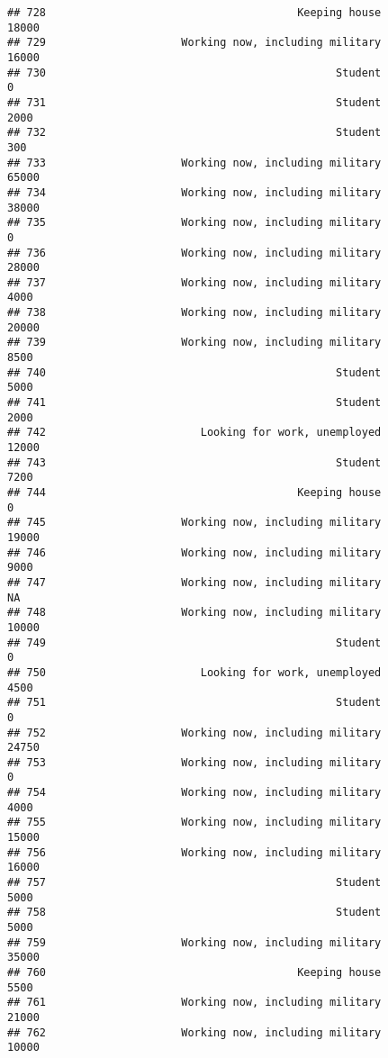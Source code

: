 \documentclass[]{book}
\theoremstyle{definition}
\theoremstyle{definition}
\theoremstyle{remark}
\begin{document}
\begin{verbatim}
## 728                                       Keeping house           18000
## 729                     Working now, including military           16000
## 730                                             Student               0
## 731                                             Student            2000
## 732                                             Student             300
## 733                     Working now, including military           65000
## 734                     Working now, including military           38000
## 735                     Working now, including military               0
## 736                     Working now, including military           28000
## 737                     Working now, including military            4000
## 738                     Working now, including military           20000
## 739                     Working now, including military            8500
## 740                                             Student            5000
## 741                                             Student            2000
## 742                        Looking for work, unemployed           12000
## 743                                             Student            7200
## 744                                       Keeping house               0
## 745                     Working now, including military           19000
## 746                     Working now, including military            9000
## 747                     Working now, including military              NA
## 748                     Working now, including military           10000
## 749                                             Student               0
## 750                        Looking for work, unemployed            4500
## 751                                             Student               0
## 752                     Working now, including military           24750
## 753                     Working now, including military               0
## 754                     Working now, including military            4000
## 755                     Working now, including military           15000
## 756                     Working now, including military           16000
## 757                                             Student            5000
## 758                                             Student            5000
## 759                     Working now, including military           35000
## 760                                       Keeping house            5500
## 761                     Working now, including military           21000
## 762                     Working now, including military           10000

\end{verbatim}
\end{document}
